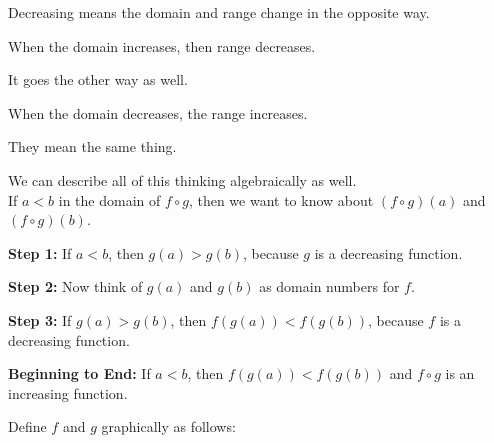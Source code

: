 \documentclass{ximera}
\begin{document}
\begin{warning}

Decreasing means the domain and range change in the opposite way.

When the domain increases, then range decreases.

It goes the other way as well.

When the domain decreases, the range increases.

They mean the same thing.


\end{warning}






We can describe all of this thinking algebraically as well. \\


If $a < b$ in the domain of $f \circ g$, then we want to know about $(f \circ g)(a)$  and $(f \circ g)(b)$.



\textbf{Step 1:}  If $a < b$, then $g(a) > g(b)$, because $g$ is a decreasing function.


\textbf{Step 2:}  Now think of $g(a)$ and $g(b)$ as domain numbers for $f$.


\textbf{Step 3:}  If $g(a) > g(b)$, then $f(g(a)) < f(g(b))$, because $f$ is a decreasing function.


\textbf{Beginning to End:} If $a < b$, then $f(g(a)) < f(g(b))$ and $f \circ g$ is an increasing function.































Define $f$ and $g$ graphically as follows:
\end{document}
